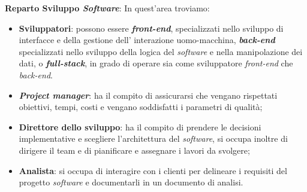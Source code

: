 \textbf{Reparto Sviluppo \textit{Software}}: In quest'area troviamo:
\begin{itemize}
    \item \textbf{Sviluppatori}: possono essere \textbf{\textit{front-end}}, specializzati nello sviluppo di interfacce e della gestione dell'
          interazione uomo-macchina, \textbf{\textit{back-end}} specializzati nello sviluppo della logica del \textit{software} e nella manipolazione dei 
          dati, o \textbf{\textit{full-stack}}, in grado di operare sia come sviluppatore \textit{front-end} che \textit{back-end}.
    \item \textbf{\textit{Project manager}}: ha il compito di assicurarsi che vengano rispettati obiettivi, tempi, costi e vengano soddisfatti
          i parametri di qualità;
    \item \textbf{Direttore dello sviluppo}: ha il compito di prendere le decisioni implementative e scegliere l'architettura del \textit{software}, si 
          occupa inoltre di dirigere il team e di pianificare e assegnare i lavori da svolgere;
    \item \textbf{Analista}: si occupa di interagire con i clienti per delineare i requisiti del progetto \textit{software} e documentarli in un documento 
          di analisi.
\end{itemize}

